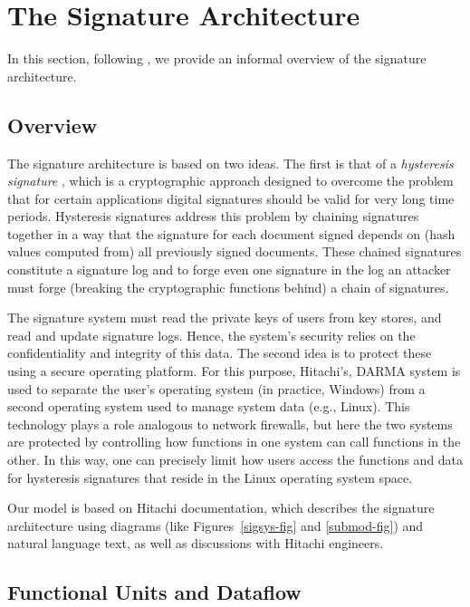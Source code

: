 \documentclass[a4paper,pdftex]{article}
\newcommand{\sigsys}{signature architecture}
\begin{document}
\section{The Signature Architecture} \label{sig-arch}

In this section, following \cite{iicis03}, we provide an
informal overview of the signature architecture.

\subsection{Overview}
The signature architecture is based on two ideas.  The first
is that of a \emph{hysteresis signature} \cite{susaki2002},
which is a cryptographic approach 
designed  to overcome the problem that for certain applications
digital signatures should be valid for very long time periods.  
Hysteresis signatures address this problem by
chaining signatures together in a way that the
signature for each document signed depends on (hash values
computed from) all previously signed documents.  These chained signatures
constitute a signature log and to forge even one signature in the log an attacker must
forge (breaking the cryptographic
functions behind) a chain of signatures.

The signature system must read the private keys of users from key
stores, and read and update signature logs.  Hence, the system's
security relies on the confidentiality and integrity of this data.  The
second idea is to protect these using a secure operating platform.  For
this purpose, Hitachi's, DARMA system \cite{arai99} is used to separate the user's
operating system (in practice, Windows) from a second operating system
used to manage system data (e.g., Linux).  This technology plays a role
analogous to network firewalls, but here the two systems are protected
by controlling how functions in one system can call functions in the other.
In this way, one
can precisely limit how users access the functions and data for
hysteresis signatures that reside in the Linux operating system space.


Our model is based on Hitachi documentation, which describes the
\sigsys{} using diagrams (like Figures~\ref{sigsys-fig} and
\ref{submod-fig}) and natural language text, as well as discussions
with Hitachi engineers.  


\subsection{Functional Units and Dataflow} \label{func-unit-sec}
\end{document}
